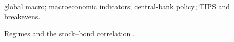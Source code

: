 \begin{qfdefinition}
 \hyperref[def:global-macro-strategy]{global macro}; \hyperref[def:macroeconomic-indicators]{macroeconomic indicators}; \hyperref[def:central-bank-policy-framework]{central-bank policy}; \hyperref[def:tips-breakevens]{TIPS and breakevens}.

 Regimes and the stock--bond correlation \citep{wide-ang-timmermann-regimes}.

\end{qfdefinition}

